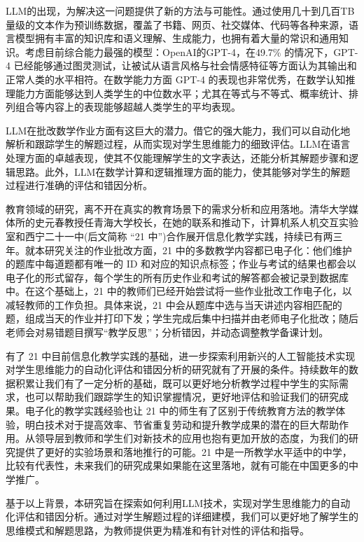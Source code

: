 LLM的出现，为解决这一问题提供了新的方法与可能性。通过使用几十到几百TB量级的文本作为预训练数据，覆盖了书籍、网页、社交媒体、代码等各种来源，语言模型拥有丰富的知识库和语义理解、生成能力，也拥有着大量的常识和通用知识。考虑目前综合能力最强的模型：OpenAI的GPT-4，在49.7\% 的情况下，GPT-4 已经能够通过图灵测试，让被试从语言风格与社会情感特征等方面认为其输出和正常人类的水平相符\cite{jones2024does}。在数学能力方面 GPT-4 的表现也非常优秀，在数学认知推理能力方面能够达到人类学生的中位数水平；尤其在等式与不等式、概率统计、排列组合等内容上的表现能够超越人类学生的平均表现\cite{zhuang2023efficiently}。

LLM在批改数学作业方面有这巨大的潜力。借它的强大能力，我们可以自动化地解析和跟踪学生的解题过程，从而实现对学生思维能力的细致评估。LLM在语言处理方面的卓越表现，使其不仅能理解学生的文字表达，还能分析其解题步骤和逻辑思路。此外，LLM在数学计算和逻辑推理方面的能力，使其能够对学生的解题过程进行准确的评估和错因分析。

教育领域的研究，离不开在真实的教育场景下的需求分析和应用落地。清华大学媒体所的史元春教授任青海大学校长，在她的联系和推动下，计算机系人机交互实验室和西宁二十一中(后文简称 “21 中”)合作展开信息化教学实践，持续已有两三年。就本研究关注的作业批改方面，21 中的多数教学内容都已电子化：他们维护的题库中每道题都有唯一的 ID 和对应的知识点标签；作业与考试的结果也都会以电子化的形式留存，每个学生的所有历史作业和考试的解答都会被记录到数据库中。在这个基础上，21 中的教师们已经开始尝试将一些作业批改工作电子化，以减轻教师的工作负担。具体来说，21 中会从题库中选与当天讲述内容相匹配的题，组成当天的作业并打印下发；学生完成后集中扫描并由老师电子化批改；随后老师会对易错题目撰写“教学反思”；分析错因，并动态调整教学备课计划。

有了 21 中目前信息化教学实践的基础，进一步探索利用新兴的人工智能技术实现对学生思维能力的自动化评估和错因分析的研究就有了开展的条件。持续数年的数据积累让我们有了一定分析的基础，既可以更好地分析教学过程中学生的实际需求，也可以帮助我们跟踪学生的知识掌握情况，更好地评估和验证我们的研究成果。电子化的教学实践经验也让 21 中的师生有了区别于传统教育方法的教学体验，明白技术对于提高效率、节省重复劳动和提升教学成果的潜在的巨大帮助作用。从领导层到教师和学生们对新技术的应用也抱有更加开放的态度，为我们的研究提供了更好的实验场景和落地推行的可能。21 中是一所教学水平适中的中学，比较有代表性，未来我们的研究成果如果能在这里落地，就有可能在中国更多的中学推广。

基于以上背景，本研究旨在探索如何利用LLM技术，实现对学生思维能力的自动化评估和错因分析。通过对学生解题过程的详细建模，我们可以更好地了解学生的思维模式和解题思路，为教师提供更为精准和有针对性的评估和指导。


